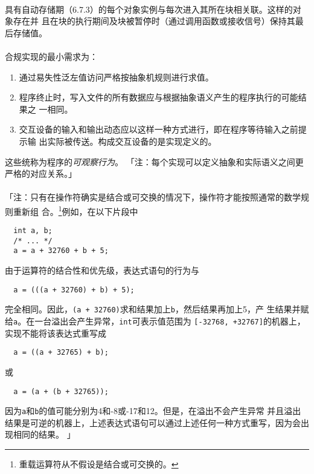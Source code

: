 \paragraph{}
具有自动存储期（6.7.3）的每个对象实例与每次进入其所在块相关联。这样的对象存在并
且在块的执行期间及块被暂停时（通过调用函数或接收信号）保持其最后存储值。

\paragraph{}
合规实现的最小需求为：
\begin{enumerate}
  \item 通过易失性泛左值访问严格按抽象机规则进行求值。
  \item 程序终止时，写入文件的所有数据应与根据抽象语义产生的程序执行的可能结果之
    一相同。
  \item 交互设备的输入和输出动态应以这样一种方式进行，即在程序等待输入之前提示输
    出实际被传送。构成交互设备的是实现定义的。
\end{enumerate}
这些统称为程序的\textit{可观察行为}。
「注：每个实现可以定义抽象和实际语义之间更严格的对应关系。」

\paragraph{}
「注：只有在操作符确实是结合或可交换的情况下，操作符才能按照通常的数学规则重新组
合。\footnote{重载运算符从不假设是结合或可交换的。}例如，在以下片段中
\begin{lstlisting}
  int a, b;
  /* ... */
  a = a + 32760 + b + 5;
\end{lstlisting}
由于运算符的结合性和优先级，表达式语句的行为与
\begin{lstlisting}
  a = (((a + 32760) + b) + 5);
\end{lstlisting}
完全相同。因此，\texttt{(a + 32760)}求和结果加上\texttt{b}，然后结果再加上5，产
生结果并赋给\texttt{a}。在一台溢出会产生异常，\texttt{int}可表示值范围为
\texttt{[-32768, +32767]}的机器上，实现不能将该表达式重写成
\begin{lstlisting}
  a = ((a + 32765) + b);
\end{lstlisting}
或
\begin{lstlisting}
  a = (a + (b + 32765));
\end{lstlisting}
因为\texttt{a}和\texttt{b}的值可能分别为4和-8或-17和12。但是，在溢出不会产生异常
并且溢出结果是可逆的机器上，上述表达式语句可以通过上述任何一种方式重写，因为会出
现相同的结果。
」

